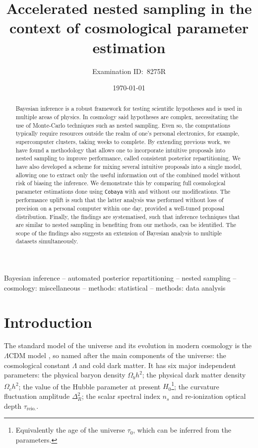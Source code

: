 \documentclass[usenatbib]{mnras}
\author[8275R]{Examination ID:~8275R}
\date{\today}
\title[Accelerated Nested Sampling]{Accelerated nested sampling in the context of cosmological parameter estimation}
\begin{document}
\maketitle
\begin{abstract}
  Bayesian inference is a robust framework for testing scientific
  hypotheses and is used in multiple areas of physics. In cosmology
  said hypotheses are complex, necessitating the use of Monte-Carlo
  techniques such as nested sampling. Even so, the computations
  typically require resources outside the realm of one's personal
  electronics, for example, supercomputer clusters, taking weeks to
  complete. By extending previous work, we have found a methodology
  that allows one to incorporate intuitive proposals into nested
  sampling to improve performance, called consistent posterior
  repartitioning. We have also developed a scheme for mixing several
  intuitive proposals into a single model, allowing one to extract
  only the useful information out of the combined model without risk
  of biasing the inference. We demonstrate this by comparing full
  cosmological parameter estimations done using \texttt{Cobaya} with
  and without our modifications. The performance uplift is such that
  the latter analysis was performed without loss of precision on a
  personal computer within one day, provided a well-tuned proposal
  distribution. Finally, the findings are systematised, such that
  inference techniques that are similar to nested sampling in
  benefiting from our methods, can be identified. The scope of the
  findings also suggests an extension of Bayesian analysis to multiple
  datasets simultaneously.
\end{abstract}

\begin{keywords}
Bayesian inference -- automated posterior repartitioning -- nested sampling -- cosmology: miscellaneous -- methods: statistical -- methods: data analysis
\end{keywords}

\section{Introduction}\label{sec:org14413d7}

The standard model of the universe and its evolution in modern
cosmology is the \(\Lambda\)CDM model \citep{Condon2018}, so named
after the main components of the universe: the cosmological constant
\(\Lambda\) and cold dark matter. It has six major independent
parameters: the physical baryon density \(\Omega_{b}h^{2}\); the
physical dark matter density \(\Omega_{c}h^{2}\); the value of the
Hubble parameter at present \(H_{0}\)\footnote{Equivalently the age of
  the universe \(\tau_0\), which can be inferred from the
  parameters. }; the curvature fluctuation amplitude
\(\Delta_{R}^{2}\); the scalar spectral index \(n_{s}\) and
re-ionization optical depth \(\tau_\text{reio.}\).
\end{document}
